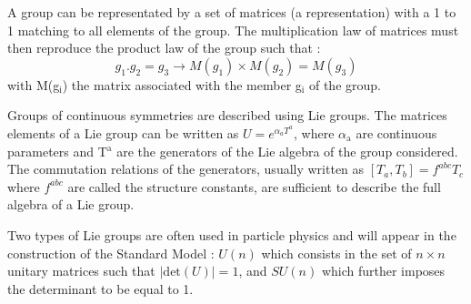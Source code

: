 A group can be representated by a set of matrices (a representation) with a 1 to 1 matching to all elements of the group.
The multiplication law of matrices must then reproduce the product law of the group such that :
\begin{equation}
g_1 . g_2 = g_3 \rightarrow M(g_1)\times M(g_2)=M(g_3)
\end{equation}
with M(g\(_{\text{i}}\)) the matrix associated with the member g\(_{\text{i}}\) of the group.

Groups of continuous symmetries are described using Lie groups.
The matrices elements of  a Lie group can be written as \(U=e^{\alpha_a T^a}\), where \(\alpha_{\text{a}}\) are continuous parameters and T\(^{\text{a}}\) are the generators of the Lie algebra of the group considered.
The commutation relations of the generators, usually written as \([T_a,T_b]=f^{abc}T_c\) where \(f^{abc}\) are called the structure constants, are sufficient to describe the full algebra of a Lie group.

Two types of Lie groups are often used in particle physics and will appear in the construction of the Standard Model : \(U(n)\) which consists in the set of \(n\times n\) unitary matrices such that \(|\text{det}(U)|=1\), and \(SU(n)\) which further imposes the determinant to be equal to 1.

